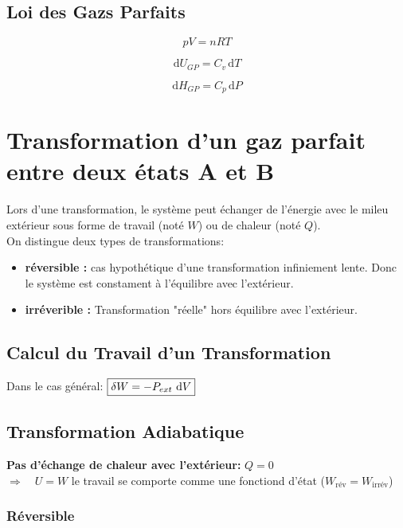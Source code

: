 \documentclass[a4paper,12pt]{article}
\newcommand{\diff}{\mathrm{d}} %
\newcommand{\re}{\textrm}
\begin{document}
    \subsection{Loi des Gazs Parfaits}
    $$ \boxed{pV = nRT} $$

    $$ \boxed{ \diff U_{GP} = C_v \, \diff T } $$

    $$ \boxed{ \diff H_{GP} = C_p \, \diff P } $$



\section{Transformation d'un gaz parfait entre deux états A et B}

    Lors d'une transformation, le système peut échanger de l'énergie avec le mileu extérieur
    sous forme de travail (noté $W$) ou de chaleur (noté $Q$).\\
    On distingue deux types de transformations:
    \begin{itemize}
        \item \textbf{réversible :} cas hypothétique d'une transformation infiniement lente. Donc le système est constament à l'équilibre avec l'extérieur.
        \item \textbf{irréverible :} Transformation "réelle" hors équilibre avec l'extérieur.
    \end{itemize}


    \subsection{Calcul du Travail d'un Transformation}

        Dans le cas général: $ \boxed{\delta W = - P_{ext}\ \re d V} $


    \subsection{Transformation Adiabatique}

        \textbf{Pas d'échange de chaleur avec l'extérieur:} $\boxed{Q = 0}$\\ 
        $\Longrightarrow \quad U = W$ \quad le travail se comporte comme une fonctiond d'état ($W_{\text{rév}} = W_{\text{irrév}}$)

        \subsubsection{Réversible}
\end{document}
